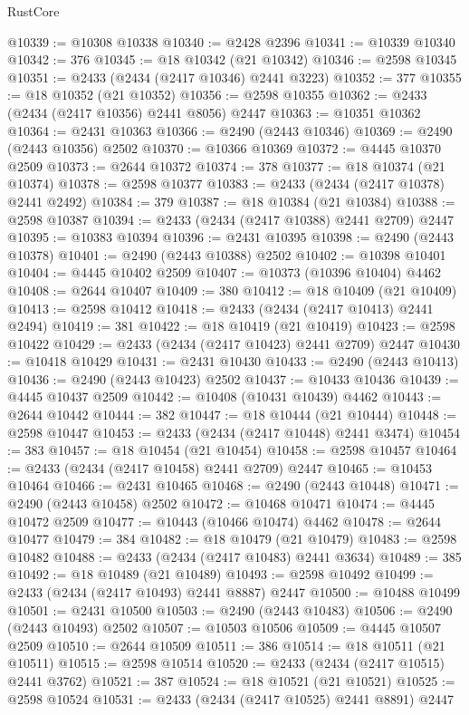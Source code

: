 \begin{lexlean}{RustCore}
\begin{coremodule}
@10339 := @10308 @10338
@10340 := @2428 @2396
@10341 := @10339 @10340
@10342 := 376
@10345 := @18 @10342 (@21 @10342)
@10346 := @2598 @10345
@10351 := @2433 (@2434 (@2417 @10346) @2441 @3223)
@10352 := 377
@10355 := @18 @10352 (@21 @10352)
@10356 := @2598 @10355
@10362 := @2433 (@2434 (@2417 @10356) @2441 @8056) @2447
@10363 := @10351 @10362
@10364 := @2431 @10363
@10366 := @2490 (@2443 @10346)
@10369 := @2490 (@2443 @10356) @2502
@10370 := @10366 @10369
@10372 := @4445 @10370 @2509
@10373 := @2644 @10372
@10374 := 378
@10377 := @18 @10374 (@21 @10374)
@10378 := @2598 @10377
@10383 := @2433 (@2434 (@2417 @10378) @2441 @2492)
@10384 := 379
@10387 := @18 @10384 (@21 @10384)
@10388 := @2598 @10387
@10394 := @2433 (@2434 (@2417 @10388) @2441 @2709) @2447
@10395 := @10383 @10394
@10396 := @2431 @10395
@10398 := @2490 (@2443 @10378)
@10401 := @2490 (@2443 @10388) @2502
@10402 := @10398 @10401
@10404 := @4445 @10402 @2509
@10407 := @10373 (@10396 @10404) @4462
@10408 := @2644 @10407
@10409 := 380
@10412 := @18 @10409 (@21 @10409)
@10413 := @2598 @10412
@10418 := @2433 (@2434 (@2417 @10413) @2441 @2494)
@10419 := 381
@10422 := @18 @10419 (@21 @10419)
@10423 := @2598 @10422
@10429 := @2433 (@2434 (@2417 @10423) @2441 @2709) @2447
@10430 := @10418 @10429
@10431 := @2431 @10430
@10433 := @2490 (@2443 @10413)
@10436 := @2490 (@2443 @10423) @2502
@10437 := @10433 @10436
@10439 := @4445 @10437 @2509
@10442 := @10408 (@10431 @10439) @4462
@10443 := @2644 @10442
@10444 := 382
@10447 := @18 @10444 (@21 @10444)
@10448 := @2598 @10447
@10453 := @2433 (@2434 (@2417 @10448) @2441 @3474)
@10454 := 383
@10457 := @18 @10454 (@21 @10454)
@10458 := @2598 @10457
@10464 := @2433 (@2434 (@2417 @10458) @2441 @2709) @2447
@10465 := @10453 @10464
@10466 := @2431 @10465
@10468 := @2490 (@2443 @10448)
@10471 := @2490 (@2443 @10458) @2502
@10472 := @10468 @10471
@10474 := @4445 @10472 @2509
@10477 := @10443 (@10466 @10474) @4462
@10478 := @2644 @10477
@10479 := 384
@10482 := @18 @10479 (@21 @10479)
@10483 := @2598 @10482
@10488 := @2433 (@2434 (@2417 @10483) @2441 @3634)
@10489 := 385
@10492 := @18 @10489 (@21 @10489)
@10493 := @2598 @10492
@10499 := @2433 (@2434 (@2417 @10493) @2441 @8887) @2447
@10500 := @10488 @10499
@10501 := @2431 @10500
@10503 := @2490 (@2443 @10483)
@10506 := @2490 (@2443 @10493) @2502
@10507 := @10503 @10506
@10509 := @4445 @10507 @2509
@10510 := @2644 @10509
@10511 := 386
@10514 := @18 @10511 (@21 @10511)
@10515 := @2598 @10514
@10520 := @2433 (@2434 (@2417 @10515) @2441 @3762)
@10521 := 387
@10524 := @18 @10521 (@21 @10521)
@10525 := @2598 @10524
@10531 := @2433 (@2434 (@2417 @10525) @2441 @8891) @2447

\end{coremodule}
\end{lexlean}
